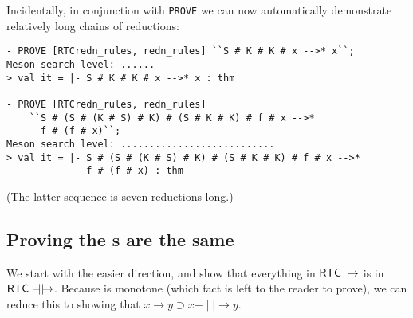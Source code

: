 \documentclass[12pt]{article}
\newcommand{\mathpredn}{\mathbin{-\!\!\!\mid\mid\!\rightarrow}}
\begin{document}
Incidentally, in conjunction with \texttt{PROVE} we can now
automatically demonstrate relatively long chains of reductions:
\begin{session}\begin{verbatim}
- PROVE [RTCredn_rules, redn_rules] ``S # K # K # x -->* x``;
Meson search level: ......
> val it = |- S # K # K # x -->* x : thm

- PROVE [RTCredn_rules, redn_rules]
    ``S # (S # (K # S) # K) # (S # K # K) # f # x -->*
      f # (f # x)``;
Meson search level: ...........................
> val it = |- S # (S # (K # S) # K) # (S # K # K) # f # x -->*
              f # (f # x) : thm
\end{verbatim}\end{session}
(The latter sequence is seven reductions long.)


\subsection{Proving the s are the same}
\label{sec:Proving-RTCs-same}

We start with the easier direction, and show that everything in
${\sf RTC}\;\rightarrow$ is in $\con{RTC}\;\mathpredn$.  Because
 is monotone (which fact is left to the reader to prove),
we can reduce this to showing that $x\rightarrow y\supset
x\mathpredn y$.
\end{document}
